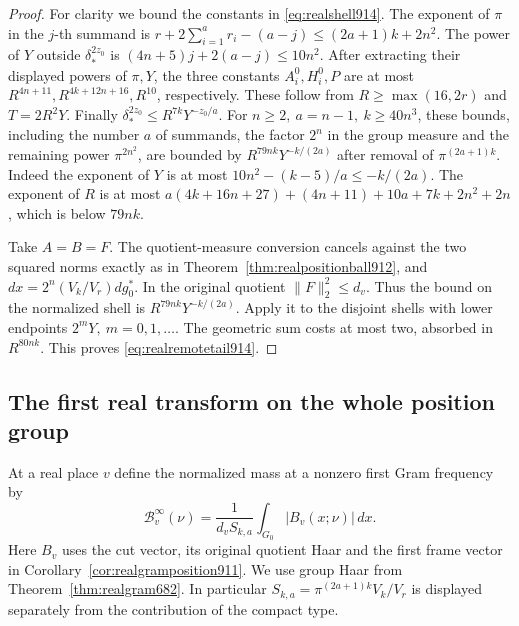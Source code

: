 \documentclass[a4paper,11pt]{article}
\theoremstyle{definition}
\theoremstyle{remark}
\numberwithin{equation}{section}
\begin{document}
\begin{proof}
For clarity we bound the constants in \eqref{eq:realshell914}.
The exponent of \(\pi\) in the \(j\)-th summand is
\(r+2\sum_{i=1}^a r_i-(a-j)\le (2a+1)k+2n^2\).
The power of \(Y\) outside \(\delta_*^{2z_0}\) is
\((4n+5)j+2(a-j)\le10n^2\).
After extracting their displayed powers of \(\pi,Y\),
the three constants \(A_i^0,H_i^0,P\) are at most
\(R^{4n+11},R^{4k+12n+16},R^{10}\), respectively.
These follow from \(R\ge\max(16,2r)\) and \(T=2R^2Y\).
Finally
\(\delta_*^{2z_0}\le R^{7k}Y^{-z_0/a}\).
For \(n\ge2,\ a=n-1,\ k\ge40n^3\), these bounds, including
the number \(a\) of summands, the factor \(2^n\) in the group
measure and the remaining power \(\pi^{2n^2}\), are bounded by
\(R^{79nk}Y^{-k/(2a)}\) after removal of \(\pi^{(2a+1)k}\).
Indeed the exponent of \(Y\) is at most \(10n^2-(k-5)/a\le-k/(2a)\).
The exponent of \(R\) is at most
\(a(4k+16n+27)+(4n+11)+10a+7k+2n^2+2n\), which is below \(79nk\).

Take \(A=B=F\). The quotient-measure conversion cancels
against the two squared norms exactly as in
Theorem~\ref{thm:realpositionball912}, and
\(dx=2^n(V_k/V_r)dg_0^*\). In the original quotient
\(\|F\|_2^2\le d_v\). Thus the bound on the normalized shell
is \(R^{79nk}Y^{-k/(2a)}\). Apply it to the disjoint shells
with lower endpoints \(2^mY,\ m=0,1,\ldots\). The geometric
sum costs at most two, absorbed in \(R^{80nk}\).
This proves \eqref{eq:realremotetail914}.
\end{proof}
\clearpage

\subsection{The first real transform on the whole position group}
\label{sec:fullrealfirst915}

At a real place \(v\) define the normalized mass at a nonzero
first Gram frequency by
\[
       \mathcal B^\infty_v(\nu)
          =\frac{1}{d_v S_{k,a}}
                     \int_{G_0}|B_v(x;\nu)|\,dx .
\]
Here \(B_v\) uses the cut vector, its original quotient Haar
and the first frame vector in Corollary~\ref{cor:realgramposition911}.
We use group Haar from Theorem~\ref{thm:realgram682}. In particular
\(S_{k,a}=\pi^{(2a+1)k}V_k/V_r\) is displayed separately from
the contribution of the compact type.
\end{document}
